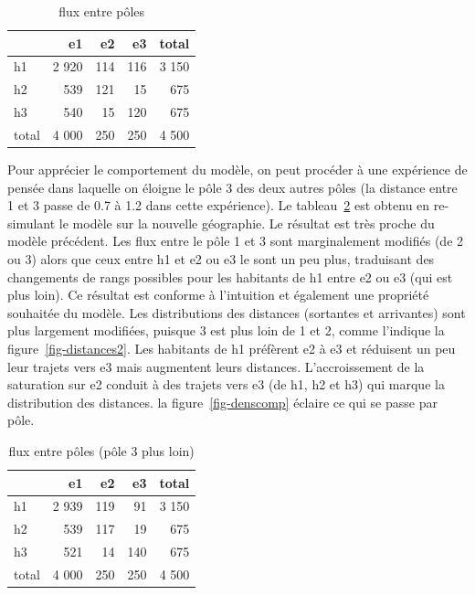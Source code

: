 \documentclass[
  10pt,
  a4paper,
  numbers=noendperiod,
  DIV=9]{scrreprt}
\begin{document}
\hypertarget{tbl-fluxpoles}{}
\begin{longtable}{lrrrr}
\caption{\label{tbl-fluxpoles}flux entre pôles }\tabularnewline

\toprule
 & e1 & e2 & e3 & total \\ 
\midrule
h1 & 2 920 & 114 & 116 & 3 150 \\ 
h2 & 539 & 121 & 15 & 675 \\ 
h3 & 540 & 15 & 120 & 675 \\ 
total & 4 000 & 250 & 250 & 4 500 \\ 
\bottomrule
\end{longtable}

Pour apprécier le comportement du modèle, on peut procéder à une
expérience de pensée dans laquelle on éloigne le pôle 3 des deux autres
pôles (la distance entre 1 et 3 passe de 0.7 à 1.2 dans cette
expérience). Le tableau~\ref{tbl-fluxpoles2} est obtenu en re-simulant
le modèle sur la nouvelle géographie. Le résultat est très proche du
modèle précédent. Les flux entre le pôle 1 et 3 sont marginalement
modifiés (de 2 ou 3) alors que ceux entre h1 et e2 ou e3 le sont un peu
plus, traduisant des changements de rangs possibles pour les habitants
de h1 entre e2 ou e3 (qui est plus loin). Ce résultat est conforme à
l'intuition et également une propriété souhaitée du modèle. Les
distributions des distances (sortantes et arrivantes) sont plus
largement modifiées, puisque 3 est plus loin de 1 et 2, comme l'indique
la figure~\ref{fig-distances2}. Les habitants de h1 préfèrent e2 à e3 et
réduisent un peu leur trajets vers e3 mais augmentent leurs distances.
L'accroissement de la saturation sur e2 conduit à des trajets vers e3
(de h1, h2 et h3) qui marque la distribution des distances. la
figure~\ref{fig-denscomp} éclaire ce qui se passe par pôle.

\hypertarget{tbl-fluxpoles2}{}
\begin{longtable}{lrrrr}
\caption{\label{tbl-fluxpoles2}flux entre pôles (pôle 3 plus loin) }\tabularnewline

\toprule
 & e1 & e2 & e3 & total \\ 
\midrule
h1 & 2 939 & 119 & 91 & 3 150 \\ 
h2 & 539 & 117 & 19 & 675 \\ 
h3 & 521 & 14 & 140 & 675 \\ 
total & 4 000 & 250 & 250 & 4 500 \\ 
\bottomrule
\end{longtable}
\end{document}
